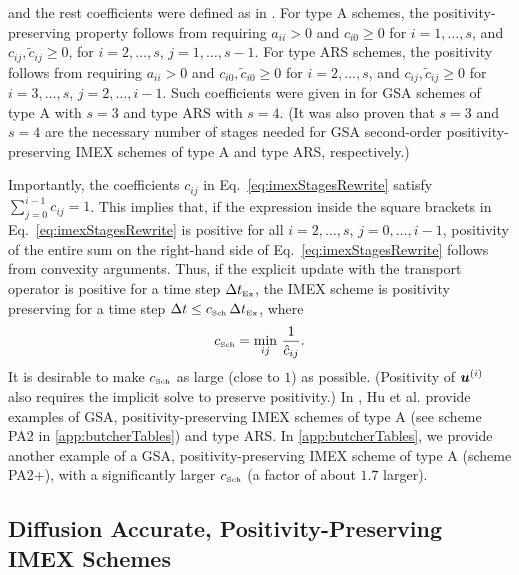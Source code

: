 and the rest coefficients were defined as in \cite{hu_etal_2017}.
For type A schemes, the positivity-preserving property follows from requiring $a_{ii}>0$ and $c_{i0}\ge0$ for $i=1,\ldots,s$, and $c_{ij},\tilde{c}_{ij}\ge0$, for $i=2,\ldots,s$, $j=1,\ldots,s-1$.  
For type ARS schemes, the positivity follows from requiring $a_{ii}>0$ and $c_{i0},\tilde{c}_{i0}\ge0$ for $i=2,\ldots,s$, and $c_{ij},\tilde{c}_{ij}\ge0$ for $i=3,\ldots,s$, $j=2,\ldots,i-1$.  
Such coefficients were given in \cite{hu_etal_2017} for GSA schemes of type A with $s=3$ and type ARS with $s=4$.  
(It was also proven that $s=3$ and $s=4$ are the necessary number of stages needed for GSA second-order positivity-preserving IMEX schemes of type A and type ARS, respectively.)  

Importantly, the coefficients $c_{ij}$ in Eq.~\eqref{eq:imexStagesRewrite} satisfy $\sum_{j=0}^{i-1}c_{ij}=1$.  
This implies that, if the expression inside the square brackets in Eq.~\eqref{eq:imexStagesRewrite} is positive for all $i=2,\ldots,s$, $j=0,\ldots,i-1$, positivity of the entire sum on the right-hand side of Eq.~\eqref{eq:imexStagesRewrite} follows from convexity arguments.  
Thus, if the explicit update with the transport operator is positive for a time step $\Delta t_{\mbox{\tiny Ex}}$, the IMEX scheme is positivity preserving for a time step $\Delta t\le c_{\mbox{\tiny Sch}}\,\Delta t_{\mbox{\tiny Ex}}$, where
\begin{equation}
  c_{\mbox{\tiny Sch}}=\min_{ij}\,\frac{1}{\hat{c}_{ij}}.  
  \label{eq:imexCFL}
\end{equation}
It is desirable to make $c_{\mbox{\tiny Sch}}$ as large (close to $1$) as possible.  
(Positivity of $\boldsymbol{u}^{(i)}$ also requires the implicit solve to preserve positivity.)  
In \cite{hu_etal_2017}, Hu et al. provide examples of GSA, positivity-preserving IMEX schemes of type A (see scheme PA2 in \ref{app:butcherTables}) and type ARS.  
In \ref{app:butcherTables}, we provide another example of a GSA, positivity-preserving IMEX scheme of type A (scheme PA2+), with a significantly larger $c_{\mbox{\tiny Sch}}$ (a factor of about $1.7$ larger).  

\subsection{Diffusion Accurate, Positivity-Preserving IMEX Schemes}

